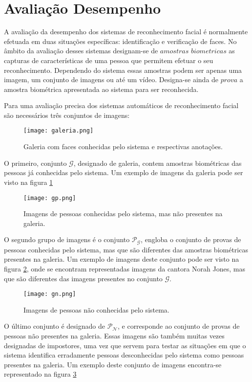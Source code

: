 \section{Avaliação Desempenho}
A avaliação da desempenho dos sistemas de reconhecimento facial é normalmente efetuada em duas situações específicas: identificação e verificação de faces. No âmbito da avaliação desses sistemas designam-se de $amostras$ $biometricas$ as capturas de características de uma pessoa que permitem efetuar o seu reconhecimento. Dependendo do sistema essas amostras podem ser apenas uma imagem, um conjunto de imagens ou até um vídeo. Designa-se ainda de $prova$ a amostra biométrica apresentada ao sistema para ser reconhecida.

Para uma avaliação precisa dos sistemas automáticos de reconhecimento facial são necessários três conjuntos de imagens:
\begin{figure}[ht]
  \begin{center}
    \leavevmode
    \texttt{[image: galeria.png]}
    \caption{Galeria com faces conhecidas pelo sistema e respectivas anotações.}	
    \label{fig:galeria}
  \end{center}
\end{figure}
O primeiro, conjunto $\mathscr{G}$, designado de galeria, contem amostras biométricas das pessoas já conhecidas pelo sistema. Um exemplo de imagens da galeria pode ser visto na figura \ref{fig:galeria}

\begin{figure}[ht]
  \begin{center}
    \leavevmode
    \texttt{[image: gp.png]}
    \caption{Imagens de pessoas conhecidas pelo sistema, mas não presentes na galeria.}	
    \label{fig:gp}
  \end{center}
\end{figure}
O segundo grupo de imagens é o conjunto $\mathscr{P}_\mathscr{G}$, engloba o conjunto de provas de pessoas conhecidas pelo sistema, mas que são diferentes das amostras biométricas presentes na galeria. Um exemplo de imagens deste conjunto pode ser visto na figura \ref{fig:gp}, onde se encontram representadas imagens da cantora Norah Jones, mas que são diferentes das imagens presentes no conjunto $\mathscr{G}$.

\begin{figure}[ht]
  \begin{center}
    \leavevmode
    \texttt{[image: gn.png]}
    \caption{Imagens de pessoas não conhecidas pelo sistema.}	
    \label{fig:gn}
  \end{center}
\end{figure}
O último conjunto é designado de $\mathscr{P}_\mathscr{N}$, e corresponde ao conjunto de provas de pessoas não presentes na galeria. Essas imagens são também muitas vezes designadas de impostores, uma vez que servem para testar as situações em que o sistema identifica erradamente pessoas desconhecidas pelo sistema como pessoas presentes na galeria. Um exemplo deste conjunto de imagens encontra-se representado na figura \ref{fig:gn}

